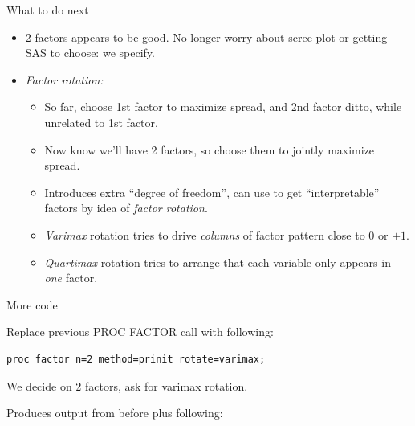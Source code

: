 \documentclass[pdf]{prosper}
\begin{document}
\begin{slide}{What to do next}

  \begin{itemize}
  \item 2 factors appears to be good. No longer worry about scree plot or getting SAS to choose: we specify.
  \item {\em Factor rotation:}
    \begin{itemize}
    \item So far, choose 1st factor to maximize spread, and 2nd factor ditto, while unrelated to 1st factor.
    \item Now know we'll have 2 factors, so choose them to jointly maximize spread.
    \item Introduces extra ``degree of freedom'', can use to get ``interpretable'' factors by idea of {\em factor rotation}.
    \item {\em Varimax} rotation tries to drive {\em columns} of factor pattern close to 0 or $\pm 1$.
    \item {\em Quartimax} rotation tries to arrange that each variable only appears in {\em one} factor.
    \end{itemize}
  \end{itemize}
  
\end{slide}

\begin{slide}{More code}

Replace previous PROC FACTOR call with following:

\begin{verbatim}
proc factor n=2 method=prinit rotate=varimax;
\end{verbatim}

We decide on 2 factors, ask for varimax rotation.

\vspace{3ex}

Produces output from before plus following:
  
\end{slide}
\end{document}
